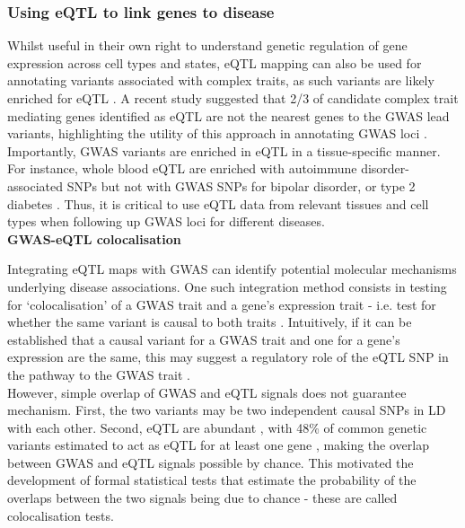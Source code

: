 \newpage

\subsubsection{Using eQTL to link genes to disease}
\label{sec:eqtl_gwas}

Whilst useful in their own right to understand genetic regulation of gene expression across cell types and states, eQTL mapping can also be used for annotating variants associated with complex traits, as such variants are likely enriched for eQTL \cite{nicolae2010trait}. 
A recent study suggested that 2/3 of candidate complex trait mediating genes identified as eQTL are not the nearest genes to the GWAS lead variants, highlighting the utility of this approach in annotating GWAS loci \cite{zhu2016integration}. 
Importantly, GWAS variants are enriched in eQTL in a tissue-specific manner. 
For instance, whole blood eQTL are enriched with autoimmune disorder-associated SNPs but not with GWAS SNPs for bipolar disorder, or type 2 diabetes \cite{gtex2015genotype}. 
Thus, it is critical to use eQTL data from relevant tissues and cell types when following up GWAS loci for different diseases.\\

\textbf{GWAS-eQTL colocalisation}

Integrating eQTL maps with GWAS can identify potential molecular mechanisms underlying disease associations.
One such integration method consists in testing for `colocalisation' of a GWAS trait and a gene’s expression trait - i.e. test for whether the same variant is causal to both traits \cite{cannon2018deciphering}.
Intuitively, if it can be established that a causal variant for a GWAS trait and one for a gene’s expression are the same, this may suggest a regulatory role of the eQTL SNP in the pathway to the GWAS trait \cite{he2013sherlock, ongen2017estimating}. \\

However, simple overlap of GWAS and eQTL signals does not guarantee mechanism. 
First, the two variants may be two independent causal SNPs in LD with each other.
Second, eQTL are abundant \cite{lappalainen2013transcriptome}, with 48\% of common genetic variants estimated to act as eQTL for at least one gene \cite{liu2019abundant}, making the overlap between GWAS and eQTL signals possible by chance.
This motivated the development of formal statistical tests that estimate the probability of the overlaps between the two signals being due to chance - these are called colocalisation tests. \\

